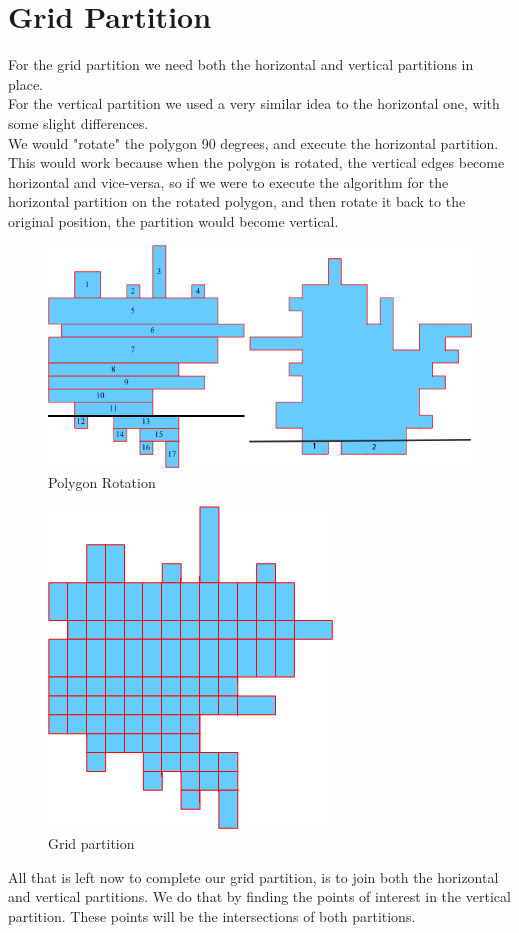 \documentclass[12pt,a4paper,oneside]{article}
\begin{document}
\section{Grid Partition}
For the grid partition we need both the horizontal and vertical partitions in place.\\
For the vertical partition we used a very similar idea to the horizontal one, with some slight differences.\\
We would "rotate" the polygon 90 degrees, and execute the horizontal partition. This would work because when the polygon is rotated, the vertical edges become horizontal and vice-versa, so if we were to execute the algorithm for the horizontal partition on the rotated polygon, and then rotate it back to the original position, the partition would become vertical.

\begin{figure}[h!]
  \centering \includegraphics[scale=0.5]{rotatedPoly.png}
  \caption{Polygon Rotation}
  \label{fig:Dcel}
\end{figure}

\begin{figure}[h!]
  \centering \includegraphics[scale=0.5]{gridPartition.png}
  \caption{Grid partition}
  \label{fig:Dcel}
\end{figure}

All that is left now to complete our grid partition, is to join both the horizontal and vertical partitions. We do that by finding the points of interest in the vertical partition. These points will be the intersections of both partitions.
\end{document}
